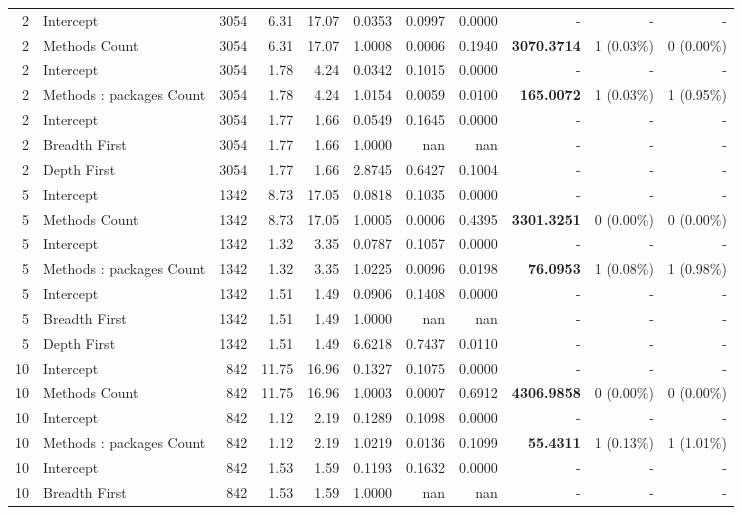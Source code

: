 \begin{landscape}
\begin{table}[H]
\begin{tabular}{r l r r r r r r r r r}
2 & Intercept & 3054 & 6.31 & 17.07 & 0.0353 & 0.0997 & 0.0000 & - & - & - \\ 
2 & Methods Count & 3054 & 6.31 & 17.07 & 1.0008 & 0.0006 & 0.1940 & \textbf{3070.3714} & 1 (0.03\%) & 0 (0.00\%) \\ 
2 & Intercept & 3054 & 1.78 & 4.24 & 0.0342 & 0.1015 & 0.0000 & - & - & - \\ 
2 & Methods : packages Count & 3054 & 1.78 & 4.24 & 1.0154 & 0.0059 & 0.0100 & \textbf{165.0072} & 1 (0.03\%) & 1 (0.95\%) \\ 
2 & Intercept & 3054 & 1.77 & 1.66 & 0.0549 & 0.1645 & 0.0000 & - & - & - \\ 
2 & Breadth First & 3054 & 1.77 & 1.66 & 1.0000 & nan & nan & - & - & - \\ 
2 & Depth First & 3054 & 1.77 & 1.66 & 2.8745 & 0.6427 & 0.1004 & - & - & - \\ 
5 & Intercept & 1342 & 8.73 & 17.05 & 0.0818 & 0.1035 & 0.0000 & - & - & - \\ 
5 & Methods Count & 1342 & 8.73 & 17.05 & 1.0005 & 0.0006 & 0.4395 & \textbf{3301.3251} & 0 (0.00\%) & 0 (0.00\%) \\ 
5 & Intercept & 1342 & 1.32 & 3.35 & 0.0787 & 0.1057 & 0.0000 & - & - & - \\ 
5 & Methods : packages Count & 1342 & 1.32 & 3.35 & 1.0225 & 0.0096 & 0.0198 & \textbf{76.0953} & 1 (0.08\%) & 1 (0.98\%) \\ 
5 & Intercept & 1342 & 1.51 & 1.49 & 0.0906 & 0.1408 & 0.0000 & - & - & - \\ 
5 & Breadth First & 1342 & 1.51 & 1.49 & 1.0000 & nan & nan & - & - & - \\ 
5 & Depth First & 1342 & 1.51 & 1.49 & 6.6218 & 0.7437 & 0.0110 & - & - & - \\ 
10 & Intercept & 842 & 11.75 & 16.96 & 0.1327 & 0.1075 & 0.0000 & - & - & - \\ 
10 & Methods Count & 842 & 11.75 & 16.96 & 1.0003 & 0.0007 & 0.6912 & \textbf{4306.9858} & 0 (0.00\%) & 0 (0.00\%) \\ 
10 & Intercept & 842 & 1.12 & 2.19 & 0.1289 & 0.1098 & 0.0000 & - & - & - \\ 
10 & Methods : packages Count & 842 & 1.12 & 2.19 & 1.0219 & 0.0136 & 0.1099 & \textbf{55.4311} & 1 (0.13\%) & 1 (1.01\%) \\ 
10 & Intercept & 842 & 1.53 & 1.59 & 0.1193 & 0.1632 & 0.0000 & - & - & - \\ 
10 & Breadth First & 842 & 1.53 & 1.59 & 1.0000 & nan & nan & - & - & - \\ 

\end{tabular}
\end{table}
\end{landscape}
